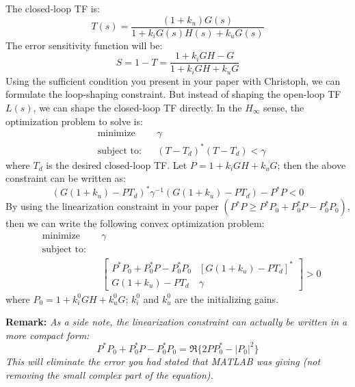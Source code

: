 \documentclass[12pt]{article}
\begin{document}
The closed-loop TF is:
\begin{equation}
T(s) = \frac{(1+k_u)G(s)}{1+k_iG(s)H(s) + k_uG(s)}
\end{equation} 
The error sensitivity function will be:
\begin{equation}
S =1-T =  \frac{1+k_iGH - G}{1+k_iGH + k_uG}
\end{equation} 
Using the sufficient condition you present in your paper with Christoph, we can formulate the loop-shaping constraint. But instead of shaping the open-loop TF $L(s)$, we can shape the closed-loop TF directly. In the $H_\infty$ sense, the optimization problem to solve is:
\begin{equation} \label{eq:min_loopshape}
\begin{aligned}
& {\text{minimize}}
& & \gamma  \\
& \text{subject to:} & & (T-T_d)^*(T-T_d) < \gamma
\end{aligned}
\end{equation}
where $T_d$ is the desired closed-loop TF. Let $P = 1+k_iGH + k_uG$; then the above constraint can be written as:
\begin{equation}
(G(1+k_u)-PT_d)^*\gamma^{-1}(G(1+k_u)-PT_d) - P^*P<0
\end{equation} 
By using the linearization constraint in your paper $(P^*P \geq P^*P_0 + P_0^*P - P_0^*P_0)$, then we can write the following convex optimization problem:
\begin{equation} \label{eq:min_loopshape}
\begin{aligned}
& {\text{minimize}}
& & \gamma  \\
& \text{subject to:} \\
& & &
\begin{bmatrix}
P^*P_0 + P_0^*P - P_0^*P_0 & [G(1+k_u)-PT_d]^* \\ 
G(1+k_u)-PT_d & \gamma
\end{bmatrix} > 0
\end{aligned}
\end{equation}
where $P_0 = 1+k_i^0GH + k_u^0G$; $k_i^0$ and $k_u^0$ are the initializing gains.

{\bf Remark:} \textit{As a side note, the linearization constraint can actually be written in a more compact form: 
\begin{equation}
P^*P_0 + P_0^*P - P_0^*P_0 = \Re \{2PP_0^* - |P_0|^2 \}
\end{equation}
This will eliminate the error you had stated that MATLAB was giving (not removing the small complex part of the equation).}
\end{document}
